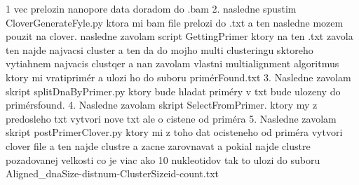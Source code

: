1 vec prelozin nanopore data doradom do .bam
2. nasledne spustim CloverGenerateFyle.py ktora mi bam file prelozi do .txt a ten nasledne mozem pouzit na clover.
nasledne zavolam script GettingPrimer ktory na ten .txt zavola ten najde najvacsi cluster a ten da do mojho multi clusteringu sktoreho vytiahnem najvacis clustqer
a nan zavolam vlastni multialignment algoritmus ktory mi vratiprimér a ulozi ho do suboru primérFound.txt
3. Nasledne zavolam skript splitDnaByPrimer.py ktory bude hladat priméry v txt bude ulozeny do primérsfound.
4. Nasledne zavolam skript SelectFromPrimer. ktory my z predosleho txt vytvori nove txt ale o cistene od priméra
5. Nasledne zavolam skript postPrimerClover.py ktory mi z toho dat ocisteneho od priméra vytvori clover file a ten najde clustre a zacne zarovnavat a pokial najde clustre pozadovanej 
velkosti co je viac ako 10 nukleotidov tak to ulozi do suboru Aligned_dnaSize-{dist}num-{ClusterSize}id-{count}.txt
